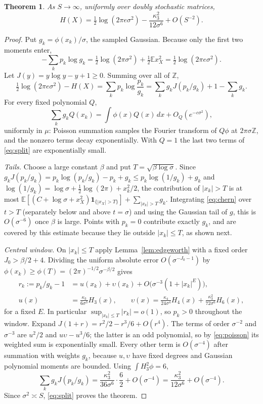 \documentclass[11pt,a4paper]{article}
\newtheorem{theorem}{Theorem}[section]\newtheorem{lemma}[theorem]{Lemma}\newtheorem{proposition}[theorem]{Proposition}\newtheorem{corollary}[theorem]{Corollary}
\theoremstyle{definition}\newtheorem{remark}[theorem]{Remark}\newtheorem{conjecture}{Conjecture}
\newcommand{\E}{\mathbb E}\newcommand{\Prb}{\mathbb P}\newcommand{\Var}{\operatorname{Var}}
\newcommand{\ind}{\mathbf 1}\newcommand{\eps}{\varepsilon}\newcommand{\dist}{d_{\rm TV}}
\begin{document}
\begin{theorem}\label{thm:entropy}
As $S\to\infty$, uniformly over doubly stochastic matrices,
\[
 H(X)=\tfrac12\log(2\pi e\sigma^2)-\frac{\kappa_3^2}{12\sigma^6}+O(S^{-2}).
\]
\end{theorem}
\begin{proof}
Put $g_k=\phi(x_k)/\sigma$, the sampled Gaussian. Because only the first two moments enter,
\[
-\sum_k p_k\log g_k=\tfrac12\log(2\pi\sigma^2)+\tfrac12\E x_X^2=\tfrac12\log(2\pi e\sigma^2).
\]
Let $J(y)=y\log y-y+1\ge0$. Summing over all of $\mathbb Z$,
\begin{equation}
\tfrac12\log(2\pi e\sigma^2)-H(X)=\sum_kp_k\log\frac{p_k}{g_k}=\sum_k g_kJ(p_k/g_k)+1-\sum_kg_k .\label{eq:split}
\end{equation}
For every fixed polynomial $Q$,
\begin{equation}
 \sum_k g_kQ(x_k)=\int\phi(x)Q(x)\,dx+O_Q(e^{-c\sigma^2}),
 \label{eq:poisson}
\end{equation}
uniformly in $\mu$: Poisson summation samples the Fourier transform of $Q\phi$ at $2\pi\sigma\mathbb Z$, and the nonzero terms decay exponentially. With $Q=1$ the last two terms of \eqref{eq:split} are exponentially small.

\emph{Tails.} Choose a large constant $\beta$ and put $T=\sqrt{\beta\log\sigma}$. Since $g_kJ(p_k/g_k)=p_k\log(p_k/g_k)-p_k+g_k\le p_k\log(1/g_k)+g_k$ and $\log(1/g_k)=\log\sigma+\tfrac12\log(2\pi)+x_k^2/2$, the contribution of $|x_k|>T$ is at most $\E[(C+\log\sigma+x_X^2)\ind_{\{|x_X|>T\}}]+\sum_{|x_k|>T}g_k$. Integrating \eqref{eq:chern} over $t>T$ (separately below and above $t=\sigma$) and using the Gaussian tail of $g$, this is $O(\sigma^{-6})$ once $\beta$ is large. Points with $p_k=0$ contribute exactly $g_k$, and are covered by this estimate because they lie outside $|x_k|\le T$, as shown next.

\emph{Central window.} On $|x_k|\le T$ apply Lemma~\ref{lem:edgeworth} with a fixed order $J_0>\beta/2+4$. Dividing the uniform absolute error $O(\sigma^{-J_0-1})$ by $\phi(x_k)\ge\phi(T)=(2\pi)^{-1/2}\sigma^{-\beta/2}$ gives
\begin{align*}
 r_k:=p_k/g_k-1 &= u(x_k)+\upsilon(x_k)+O\big(\sigma^{-3}(1+|x_k|^{E})\big),\\
 u(x)&=\frac{\kappa_3}{6\sigma^3}H_3(x),\qquad
 \upsilon(x)=\frac{\kappa_4}{24\sigma^4}H_4(x)+\frac{\kappa_3^2}{72\sigma^6}H_6(x),
\end{align*}
for a fixed $E$. In particular $\sup_{|x_k|\le T}|r_k|=o(1)$, so $p_k>0$ throughout the window. Expand $J(1+r)=r^2/2-r^3/6+O(r^4)$. The terms of order $\sigma^{-2}$ and $\sigma^{-3}$ are $u^2/2$ and $u\upsilon-u^3/6$; the latter is an odd polynomial, so by \eqref{eq:poisson} its weighted sum is exponentially small. Every other term is $O(\sigma^{-4})$ after summation with weights $g_k$, because $u,\upsilon$ have fixed degrees and Gaussian polynomial moments are bounded. Using $\int H_3^2\phi=6$,
\[
\sum_k g_kJ(p_k/g_k)=\frac{\kappa_3^2}{36\sigma^6}\cdot\frac62+O(\sigma^{-4})=\frac{\kappa_3^2}{12\sigma^6}+O(\sigma^{-4}).
\]
Since $\sigma^2\asymp S$, \eqref{eq:split} proves the theorem.
\end{proof}
\end{document}
